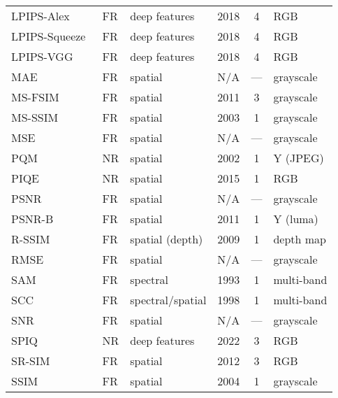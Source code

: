 \begin{longtable}{l l l c c l}
    LPIPS-Alex~\cite{Zhang2018LPIPS}       & FR   & deep features       & 2018 & 4    & RGB \\
    LPIPS-Squeeze~\cite{Zhang2018LPIPS}    & FR   & deep features       & 2018 & 4    & RGB \\
    LPIPS-VGG~\cite{Zhang2018LPIPS}        & FR   & deep features       & 2018 & 4    & RGB \\
    MAE~\cite{Gonzalez2008DIP}             & FR   & spatial             & N/A  & ---  & grayscale \\
    MS-FSIM~\cite{Zhang2011FSIM}           & FR   & spatial             & 2011 & 3    & grayscale \\
    MS-SSIM~\cite{Wang2003MSSSIM}          & FR   & spatial             & 2003 & 1    & grayscale \\
    MSE~\cite{Gonzalez2008DIP}             & FR   & spatial             & N/A  & ---  & grayscale \\
    PQM~\cite{Wang2002PQM}                 & NR   & spatial             & 2002 & 1    & Y (JPEG) \\
    PIQE~\cite{Venkatanath2015PIQE}        & NR   & spatial             & 2015 & 1    & RGB \\
    PSNR~\cite{Gonzalez2008DIP}            & FR   & spatial             & N/A  & ---  & grayscale \\
    PSNR-B~\cite{Yim2011PSNRB}             & FR   & spatial             & 2011 & 1    & Y (luma) \\
    R-SSIM~\cite{Malpica2008RSSIM}         & FR   & spatial (depth)     & 2009 & 1    & depth map \\
    RMSE~\cite{Gonzalez2008DIP}            & FR   & spatial             & N/A  & ---  & grayscale \\
    SAM~\cite{Kruse1993SAM}                & FR   & spectral            & 1993 & 1    & multi-band \\
    SCC~\cite{Zhou1998SCC}                 & FR   & spectral/spatial    & 1998 & 1    & multi-band \\
    SNR~\cite{Gonzalez2008DIP}             & FR   & spatial             & N/A  & ---  & grayscale \\
    SPIQ~\cite{Chen2022SPIQ}               & NR   & deep features       & 2022 & 3    & RGB \\
    SR-SIM~\cite{Zhang2012SRSIM}           & FR   & spatial             & 2012 & 3    & RGB \\
    SSIM~\cite{Wang2004SSIM}               & FR   & spatial             & 2004 & 1    & grayscale \\

\end{longtable}
